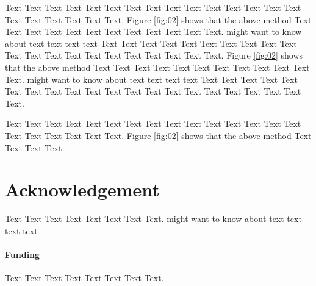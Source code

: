 \documentclass{bioinfo}
\begin{document}
Text Text Text Text Text Text  Text Text Text Text Text Text Text Text Text  Text Text Text Text Text Text. Figure \ref{fig:02} shows that the above method  Text Text Text Text  Text Text Text Text Text Text  Text Text.  \citealp{Boffelli03} might want to know about  text text text text
Text Text Text Text Text Text  Text Text Text Text Text Text Text Text Text  Text Text Text Text Text Text. Figure \ref{fig:02} shows that the above method  Text Text Text Text  Text Text Text Text Text Text  Text Text.  \citealp{Boffelli03} might want to know about  text text text text
Text Text Text Text Text Text  Text Text Text Text Text Text Text Text Text  Text Text Text Text Text Text.






Text Text Text Text Text Text  Text Text Text Text Text Text Text Text Text  Text Text Text Text Text Text. Figure \ref{fig:02} shows that the above method  Text Text Text Text


\section*{Acknowledgement}
Text Text Text Text Text Text  Text Text.  \citealp{Boffelli03} might want to know about  text text text text

\paragraph{Funding\textcolon} Text Text Text Text Text Text  Text Text.

%
%
%
%
%
%
%
%
%
\end{document}
